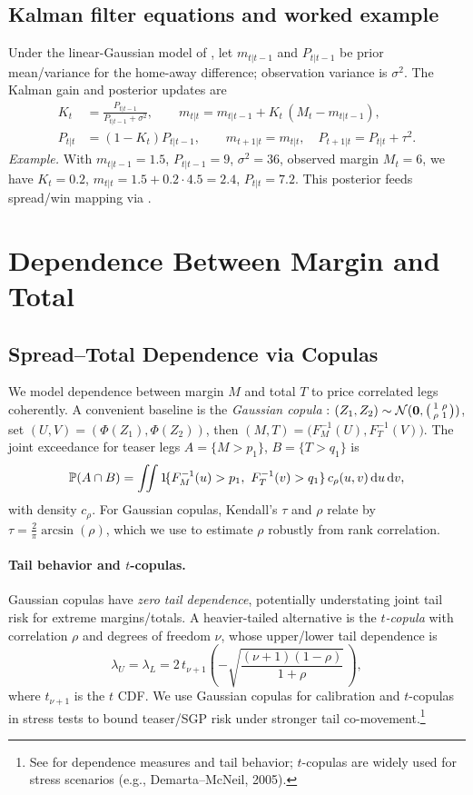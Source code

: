 \subsection{Kalman filter equations and worked example}\label{subsec:kalman-derivation}
Under the linear-Gaussian model of , let $m_{t|t-1}$ and $P_{t|t-1}$ be prior mean/variance for the home-away difference; observation variance is $\sigma^2$. The Kalman gain and posterior updates are
\begin{align}
K_t&=\frac{P_{t|t-1}}{P_{t|t-1}+\sigma^2},\qquad m_{t|t}=m_{t|t-1}+K_t\,(M_t-m_{t|t-1}),\\
P_{t|t}&=(1-K_t)P_{t|t-1},\qquad m_{t+1|t}=m_{t|t},\quad P_{t+1|t}=P_{t|t}+\tau^2.
\end{align}
\textit{Example.} With $m_{t|t-1}=1.5$, $P_{t|t-1}=9$, $\sigma^2=36$, observed margin $M_t=6$, we have $K_t=0.2$, $m_{t|t}=1.5+0.2\cdot 4.5=2.4$, $P_{t|t}=7.2$. This posterior feeds spread/win mapping via .

\section{Dependence Between Margin and Total}
\subsection{Spread–Total Dependence via Copulas}\label{subsec:copula-st}
We model dependence between margin $M$ and total $T$ to price correlated legs coherently. A convenient baseline is the \emph{Gaussian copula} \citep{nelsen2006}:
$(Z_1,Z_2)\sim \mathcal{N}(\mathbf 0,\begin{psmallmatrix}1&\rho\\ \rho&1\end{psmallmatrix})$, set $(U,V)=(\Phi(Z_1),\Phi(Z_2))$, then $(M,T)=\big(F_M^{-1}(U),F_T^{-1}(V)\big)$. The joint exceedance for teaser legs $A=\{M>p_1\}$, $B=\{T>q_1\}$ is
\[
\mathbb{P}(A\cap B)=\iint 1\!\{F_M^{-1}(u)>p_1,\ F_T^{-1}(v)>q_1\}\,c_\rho(u,v)\,\mathrm{d} u\,\mathrm{d} v,
\]
with density $c_\rho$. For Gaussian copulas, Kendall’s $\tau$ and $\rho$ relate by $\tau=\tfrac{2}{\pi}\arcsin(\rho)$, which we use to estimate $\rho$ robustly from rank correlation.

\paragraph{Tail behavior and $t$-copulas.} Gaussian copulas have \emph{zero tail dependence}, potentially understating joint tail risk for extreme margins/totals. A heavier-tailed alternative is the \emph{$t$-copula} with correlation $\rho$ and degrees of freedom $\nu$, whose upper/lower tail dependence is
\[
\lambda_U=\lambda_L=2\,t_{\nu+1}\!\left(-\sqrt{\frac{(\nu+1)(1-\rho)}{1+\rho}}\,\right),
\]
where $t_{\nu+1}$ is the $t$ CDF. We use Gaussian copulas for calibration and $t$-copulas in stress tests to bound teaser/SGP risk under stronger tail co-movement.\footnote{See \citet{joe1997} for dependence measures and tail behavior; $t$-copulas are widely used for stress scenarios (e.g., Demarta--McNeil, 2005).}

